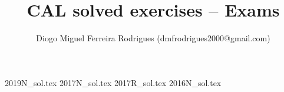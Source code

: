 \documentclass{cal}
\title{CAL solved exercises -- Exams}
\author{Diogo Miguel Ferreira Rodrigues (dmfrodrigues2000@gmail.com)}
\date{}
\begin{document}
\frontmatter
\begingroup
\maketitle
    \let\clearpage\relax
	\tableofcontents
\endgroup
\mainmatter
{2019N_sol.tex}
{2017N_sol.tex}
{2017R_sol.tex}
{2016N_sol.tex}
\end{document}
